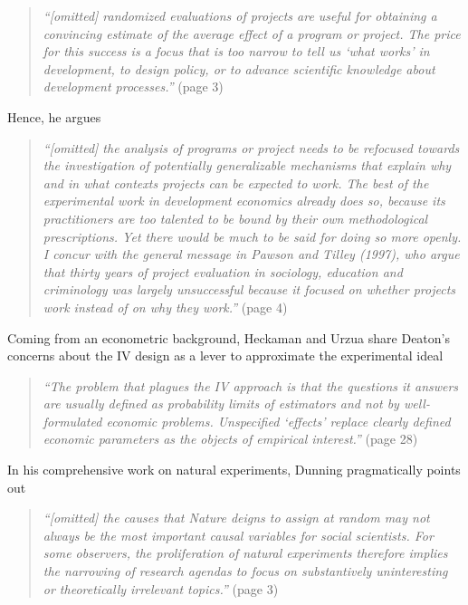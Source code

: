 \documentclass[11pt]{article}
\begin{document}
\begin{refsection}
\begin{quote}
\textit{
  ``[omitted] randomized evaluations of projects are useful for obtaining a
  convincing estimate of the average effect of a program or project. The price
  for this success is a focus that is too narrow to tell us `what works' in
  development, to design policy, or to advance scientific knowledge about
  development processes.''
  }
  (page 3)
\end{quote}

Hence, he argues

\begin{quote}
   \textit{
  ``[omitted] the analysis of programs or project needs to be refocused towards
  the investigation of potentially generalizable mechanisms that explain why and
  in what contexts projects can be expected to work. The best of the
  experimental work in development economics already does so, because its
  practitioners are too talented to be bound by their own methodological
  prescriptions. Yet there would be much to be said for doing so more openly. I
  concur with the general message in Pawson and Tilley (1997), who argue that
  thirty years of project evaluation in sociology, education and criminology was
  largely unsuccessful because it focused on whether projects work instead of on
  why they work.''
  }
  (page 4)
\end{quote}

Coming from an econometric background, Heckaman and Urzua
\autocite*{heckman_urzua_2010} share Deaton's concerns about the IV design as a
lever to approximate the experimental ideal

\begin{quote}
  \textit{
  ``The problem that plagues the IV approach is that the questions it answers
  are usually defined as probability limits of estimators and not by
  well-formulated economic problems. Unspecified `effects' replace clearly
  defined economic parameters as the objects of empirical interest.''
  }
  (page 28)
\end{quote}

In his comprehensive work on natural experiments, Dunning 
\autocite*{dunning_2012} pragmatically points out

\begin{quote}
  \textit{
  ``[omitted] the causes that Nature deigns to assign at random may not always
  be the most important causal variables for social scientists. For some
  observers, the proliferation of natural experiments therefore implies the
  narrowing of research agendas to focus on substantively uninteresting or
  theoretically irrelevant topics.''
  }
  (page 3)
\end{quote}


\end{refsection}
\end{document}
